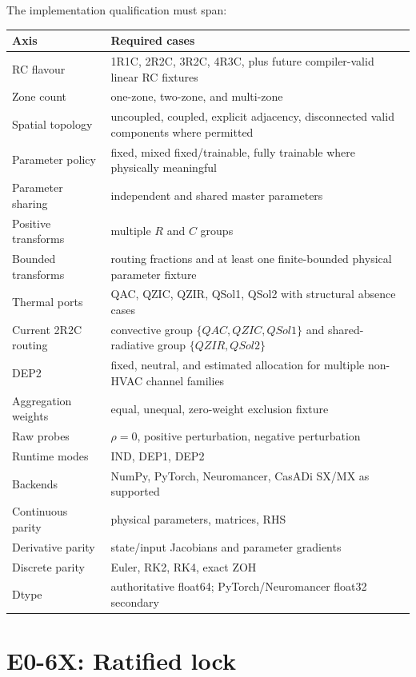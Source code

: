 \documentclass[11pt]{article}
\begin{document}
The implementation qualification must span:
\begin{longtable}{p{}p{}}
\toprule
Axis & Required cases\\
\midrule
RC flavour & 1R1C, 2R2C, 3R2C, 4R3C, plus future compiler-valid linear RC fixtures\\
Zone count & one-zone, two-zone, and multi-zone\\
Spatial topology & uncoupled, coupled, explicit adjacency, disconnected valid components where permitted\\
Parameter policy & fixed, mixed fixed/trainable, fully trainable where physically meaningful\\
Parameter sharing & independent and shared master parameters\\
Positive transforms & multiple $R$ and $C$ groups\\
Bounded transforms & routing fractions and at least one finite-bounded physical parameter fixture\\
Thermal ports & QAC, QZIC, QZIR, QSol1, QSol2 with structural absence cases\\
Current 2R2C routing & convective group $\{QAC,QZIC,QSol1\}$ and shared-radiative group $\{QZIR,QSol2\}$\\
DEP2 & fixed, neutral, and estimated allocation for multiple non-HVAC channel families\\
Aggregation weights & equal, unequal, zero-weight exclusion fixture\\
Raw probes & $\rho=0$, positive perturbation, negative perturbation\\
Runtime modes & IND, DEP1, DEP2\\
Backends & NumPy, PyTorch, Neuromancer, CasADi SX/MX as supported\\
Continuous parity & physical parameters, matrices, RHS\\
Derivative parity & state/input Jacobians and parameter gradients\\
Discrete parity & Euler, RK2, RK4, exact ZOH\\
Dtype & authoritative float64; PyTorch/Neuromancer float32 secondary\\
\bottomrule
\end{longtable}

\section{E0-6X: Ratified lock}
\end{document}
